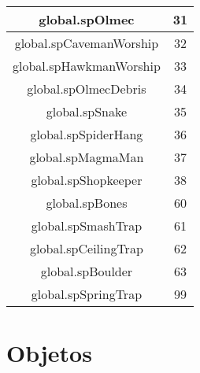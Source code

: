 \begin{center}
    \begin{tabular}{ |c|c| }
        \hline
        global.spOlmec & 31 \\ \hline
        global.spCavemanWorship & 32 \\ \hline
        global.spHawkmanWorship & 33 \\ \hline
        global.spOlmecDebris & 34 \\ \hline
        global.spSnake & 35 \\ \hline
        global.spSpiderHang & 36 \\ \hline
        global.spMagmaMan & 37 \\ \hline
        global.spShopkeeper & 38 \\ \hline
        global.spBones & 60 \\ \hline
        global.spSmashTrap & 61 \\ \hline
        global.spCeilingTrap & 62 \\ \hline
        global.spBoulder & 63 \\ \hline
        global.spSpringTrap & 99 \\ \hline
    \end{tabular}
\end{center}

\section{Objetos}

